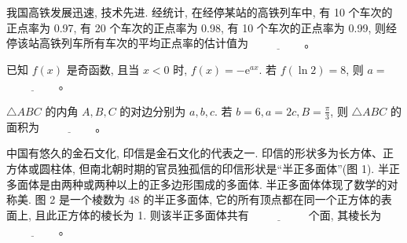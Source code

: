 \begin{question}
我国高铁发展迅速, 技术先进. 经统计, 在经停某站的高铁列车中, 有 10 个车次的正点率为 0.97, 有 20 个车次的正点率为 0.98, 有 10 个车次的正点率为 0.99, 则经停该站高铁列车所有车次的平均正点率的估计值为 $\underline{\hspace{2cm}}$。

\end{question}
\begin{question}
已知 $f(x)$ 是奇函数, 且当 $x < 0$ 时, $f(x) = -\mathrm{e}^{ax}$. 若 $f(\ln 2) = 8$, 则 $a =$ $\underline{\hspace{2cm}}$。

\end{question}
\begin{question}
$\triangle ABC$ 的内角 $A, B, C$ 的对边分别为 $a, b, c$. 若 $b = 6, a = 2c, B = \frac{\pi}{3}$, 则 $\triangle ABC$ 的面积为 $\underline{\hspace{2cm}}$。

\Needspace{0.4\textheight}
\end{question}
\begin{question}
中国有悠久的金石文化, 印信是金石文化的代表之一. 印信的形状多为长方体、正方体或圆柱体, 但南北朝时期的官员独孤信的印信形状是“半正多面体”(图 1). 半正多面体是由两种或两种以上的正多边形围成的多面体. 半正多面体体现了数学的对称美. 图 2 是一个棱数为 48 的半正多面体, 它的所有顶点都在同一个正方体的表面上, 且此正方体的棱长为 1. 则该半正多面体共有 $\underline{\hspace{2cm}}$ 个面, 其棱长为 $\underline{\hspace{2cm}}$。
\nopagebreak[4]
\begin{center}\end{center}
\nopagebreak[4]
\par\medskip

\end{question}



